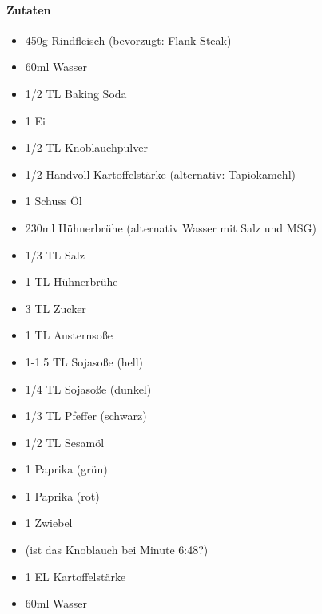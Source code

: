\newpage
{}

\paragraph{Zutaten}
\begin{itemize}[noitemsep]
	\item 450g Rindfleisch (bevorzugt: Flank Steak)
	\item 60ml Wasser
	\item 1/2 TL Baking Soda
	\item 1 Ei
	\item 1/2 TL Knoblauchpulver
	\item 1/2 Handvoll Kartoffelstärke (alternativ: Tapiokamehl)
	\item 1 Schuss Öl
	\item 230ml Hühnerbrühe (alternativ Wasser mit Salz und MSG)
	\item 1/3 TL Salz
	\item 1 TL Hühnerbrühe
	\item 3 TL Zucker
	\item 1 TL Austernsoße
	\item 1-1.5 TL Sojasoße (hell)
	\item 1/4 TL Sojasoße (dunkel)
	\item 1/3 TL Pfeffer (schwarz)
	\item 1/2 TL Sesamöl
	\item 1 Paprika (grün)
	\item 1 Paprika (rot)
	\item 1 Zwiebel
	\item (ist das Knoblauch bei Minute 6:48?)
	\item 1 EL Kartoffelstärke 
	\item 60ml Wasser
\end{itemize}

